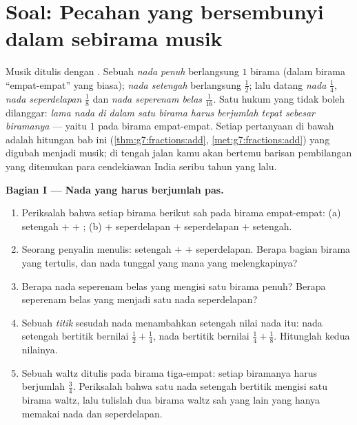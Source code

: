 \section{Soal: Pecahan yang bersembunyi dalam sebirama musik}

\begin{problem}
\label{pb:g7:fractions:1}
Musik ditulis dengan . Sebuah \emph{nada penuh} berlangsung $1$
birama (dalam birama ``empat-empat'' yang biasa); \emph{nada setengah}
berlangsung $\frac12$; lalu datang \emph{nada } $\frac14$,
\emph{nada seperdelapan} $\frac18$ dan \emph{nada seperenam belas}
$\frac{1}{16}$. Satu hukum yang tidak boleh dilanggar: \emph{lama nada
di dalam satu birama harus berjumlah tepat sebesar biramanya} ---
yaitu $1$ pada birama empat-empat. Setiap pertanyaan di bawah adalah
hitungan bab ini (\cref{thm:g7:fractions:add},
\cref{met:g7:fractions:add}) yang digubah menjadi musik; di tengah
jalan kamu akan bertemu barisan pembilangan yang ditemukan para
cendekiawan India seribu tahun yang lalu.

\medskip
\noindent\textbf{Bagian I --- Nada yang harus berjumlah pas.}
\begin{enumerate}
  \item Periksalah bahwa setiap birama berikut sah pada birama
        empat-empat: (a) setengah $+$  $+$ ; (b)
         $+$ seperdelapan $+$ seperdelapan $+$ setengah.
  \item Seorang penyalin menulis: setengah $+$  $+$
        seperdelapan. Berapa bagian birama yang tertulis, dan nada
        tunggal yang mana yang melengkapinya?
  \item Berapa nada seperenam belas yang mengisi satu birama penuh?
        Berapa seperenam belas yang menjadi satu nada seperdelapan?
  \item Sebuah \emph{titik} sesudah nada menambahkan setengah nilai
        nada itu: nada setengah bertitik bernilai $\frac12 + \frac14$,
        nada  bertitik bernilai $\frac14 + \frac18$.
        Hitunglah kedua nilainya.
  \item Sebuah waltz ditulis pada birama tiga-empat: setiap biramanya
        harus berjumlah $\frac34$. Periksalah bahwa satu nada setengah
        bertitik mengisi satu birama waltz, lalu tulislah dua birama
        waltz sah yang lain yang hanya memakai nada  dan
        seperdelapan.
\end{enumerate}


\end{problem}
